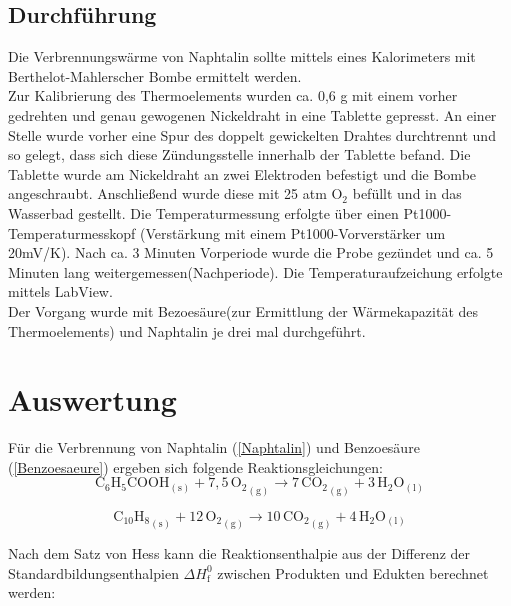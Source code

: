 \documentclass[12pt,a4paper,titlepage,headinclude,bibtotoc]{scrartcl}
\begin{document}
\subsection{Durchführung}
Die Verbrennungswärme von Naphtalin sollte mittels eines Kalorimeters mit Berthelot-Mahlerscher Bombe ermittelt werden.\\
Zur Kalibrierung des Thermoelements wurden ca. 0,6 g mit einem vorher gedrehten und genau gewogenen Nickeldraht in eine Tablette gepresst. An einer Stelle wurde vorher eine Spur des doppelt gewickelten Drahtes durchtrennt und so gelegt, dass sich diese Zündungsstelle innerhalb der Tablette befand. Die Tablette wurde am Nickeldraht an zwei Elektroden befestigt und die Bombe angeschraubt. Anschließend wurde diese mit 25 atm O$_2$ befüllt und in das Wasserbad gestellt.  Die Temperaturmessung erfolgte über einen Pt1000-\,Temperaturmesskopf (Verstärkung mit einem Pt1000-Vorverstärker um 20mV/K). Nach ca. 3 Minuten Vorperiode wurde die Probe gezündet und ca. 5 Minuten lang weitergemessen(Nachperiode).
Die Temperaturaufzeichung erfolgte mittels LabView.\\
Der Vorgang wurde mit Bezoesäure(zur Ermittlung der Wärmekapazität des Thermoelements) und Naphtalin je drei mal durchgeführt.\\ 

\section{Auswertung}

Für die Verbrennung von Naphtalin (\ref{Naphtalin}) und Benzoesäure (\ref{Benzoesaeure}) ergeben sich folgende Reaktionsgleichungen:\\

\begin{equation}\label{Benzoesaeure}
\mathrm{C_6}\mathrm{H}_5\mathrm{COOH}_\mathrm{(s)} + 7,5\,{\mathrm{O}_2}_\mathrm{(g)} \rightarrow 7\,{\mathrm{CO}_2}_\mathrm{(g)} +3\,\mathrm{H}_2\mathrm{O}_\mathrm{(l)}
\end{equation}

\begin{equation}\label{Naphtalin}
{\mathrm{C}_{10}\mathrm{H}_8}_\mathrm{(s)} + 12\,{\mathrm{O}_2}_\mathrm{(g)} \rightarrow 10\,{\mathrm{CO}_2}_\mathrm{(g)} + 4\,\mathrm{H}_2\mathrm{O}_\mathrm{(l)}
\end{equation}



Nach dem Satz von Hess kann die Reaktionsenthalpie aus der Differenz der Standardbildungsenthalpien $\Delta H_\mathrm{f}^0$ zwischen Produkten und Edukten berechnet werden:\\
\end{document}
